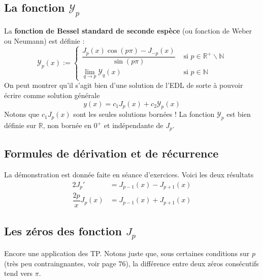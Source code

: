 	\subsection{La fonction $\mathcal{Y}_p$}
	La \textbf{fonction de Bessel standard de seconde espèce} (ou fonction de Weber ou 
	Neumann) est définie :
	\begin{equation}
	\mathcal{Y}_p(x) := \left\{\begin{array}{ll}
	\dfrac{J_p(x)\cos(p\pi)-J_{-p}(x)}{\sin(p\pi)} & \text{ si } p\in \mathbb{R}^+\backslash 
	\mathbb{N}\\
	\lim\limits_{q \rightarrow p} \mathcal{Y}_q(x) & \text{ si } p\in\mathbb{N}
	\end{array}\right.
	\end{equation}
	On peut montrer qu'il s'agit bien d'une solution de l'EDL de sorte à pouvoir écrire 
	comme solution générale
	\begin{equation}
	y(x) = c_1J_p(x) + c_2\mathcal{Y}_p(x)
	\end{equation}
	Notons que $c_1J_p(x)$ sont les seules solutions bornées ! La fonction $\mathcal{Y}_p$ 
	est bien définie sur $\mathbb{R}$, non bornée en $0^+$ et indépendante de $J_p$.


	\setcounter{subsection}{6}
	\subsection{Formules de dérivation et de récurrence}
	La démonstration est donnée faite en séance d'exercices. Voici les deux résultats 
	\begin{equation}
	\begin{array}{ll}
	2 J_p' &= J_{p-1}(x) - J_{p+1}(x)\\
	\dfrac{2p}{x}J_p(x) &= J_{p-1}(x) + J_{p+1}(x)
	\end{array}
	\end{equation}
	
	\subsection{Les zéros des fonction $J_p$}
	Encore une application des TP. Notons juste que, sous certaines conditions sur $p$ 
	(très peu contraingnantes, voir page 76), la différence entre deux zéros consécutifs 
	tend vers $\pi$.


